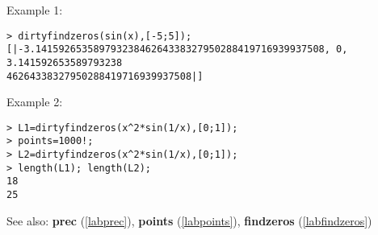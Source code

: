 \noindent Example 1: 
\begin{center}\begin{minipage}{15cm}\begin{Verbatim}[frame=single]
> dirtyfindzeros(sin(x),[-5;5]);
[|-3.14159265358979323846264338327950288419716939937508, 0, 3.141592653589793238
46264338327950288419716939937508|]
\end{Verbatim}
\end{minipage}\end{center}
\noindent Example 2: 
\begin{center}\begin{minipage}{15cm}\begin{Verbatim}[frame=single]
> L1=dirtyfindzeros(x^2*sin(1/x),[0;1]);
> points=1000!;
> L2=dirtyfindzeros(x^2*sin(1/x),[0;1]);
> length(L1); length(L2);
18
25
\end{Verbatim}
\end{minipage}\end{center}
See also: \textbf{prec} (\ref{labprec}), \textbf{points} (\ref{labpoints}), \textbf{findzeros} (\ref{labfindzeros})
